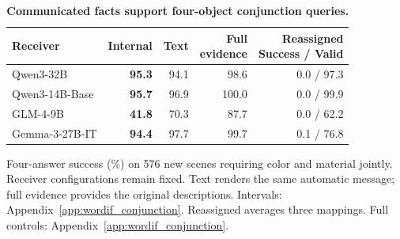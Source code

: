 \begin{table}[t]
\caption{\textbf{Communicated facts support four-object conjunction queries.}}
\label{tab:wordif_conjunction}
\centering\small
\setlength{\tabcolsep}{3.5pt}\renewcommand{\arraystretch}{1.12}
\begin{tabular*}{\linewidth}{@{\extracolsep{\fill}}lrrrr@{}}
\toprule
Receiver & \textbf{Internal} & Text & \shortstack[r]{Full\\evidence} & \shortstack[r]{Reassigned\\Success / Valid} \\
\midrule
Qwen3-32B & \textbf{95.3} & 94.1 & 98.6 & 0.0 / 97.3 \\
Qwen3-14B-Base & \textbf{95.7} & 96.9 & 100.0 & 0.0 / 99.9 \\
GLM-4-9B & \textbf{41.8} & 70.3 & 87.7 & 0.0 / 62.2 \\
Gemma-3-27B-IT & \textbf{94.4} & 97.7 & 99.7 & 0.1 / 76.8 \\
\bottomrule
\end{tabular*}
\par\vspace{3pt}
{\footnotesize\raggedright Four-answer success (\%) on 576 new scenes requiring color and material jointly. Receiver configurations remain fixed. Text renders the same automatic message; full evidence provides the original descriptions. Intervals: Appendix~\ref{app:wordif_conjunction}. Reassigned averages three mappings. Full controls: Appendix~\ref{app:wordif_conjunction}.\par}
\end{table}
